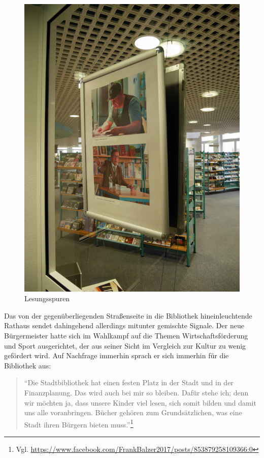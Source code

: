 \documentclass[a4paper,
fontsize=11pt,
oneside,
numbers=noperiodatend,
parskip=half-,
bibliography=totoc,
final
]{scrartcl}
\begin{document}
\begin{figure}
\centering
\includegraphics{img/image_4.jpg}
\caption{Lesungsspuren}
\end{figure}

Das von der gegenüberliegenden Straßenseite in die Bibliothek
hineinleuchtende Rathaus sendet dahingehend allerdings mitunter
gemischte Signale. Der neue Bürgermeister hatte sich im Wahlkampf auf
die Themen Wirtschaftsförderung und Sport ausgerichtet, der aus seiner
Sicht im Vergleich zur Kultur zu wenig gefördert wird. Auf Nachfrage
immerhin sprach er sich immerhin für die Bibliothek aus:

\begin{quote}
\enquote{Die Stadtbibliothek hat einen festen Platz in der Stadt und in
der Finanzplanung. Das wird auch bei mir so bleiben. Dafür stehe ich;
denn wir möchten ja, dass unsere Kinder viel lesen, sich somit bilden
und damit uns alle voranbringen. Bücher gehören zum Grundsätzlichen, was
eine Stadt ihren Bürgern bieten muss.}\footnote{Vgl.
  \url{https://www.facebook.com/FrankBalzer2017/posts/853879258109366:0}}
\end{quote}
\end{document}
